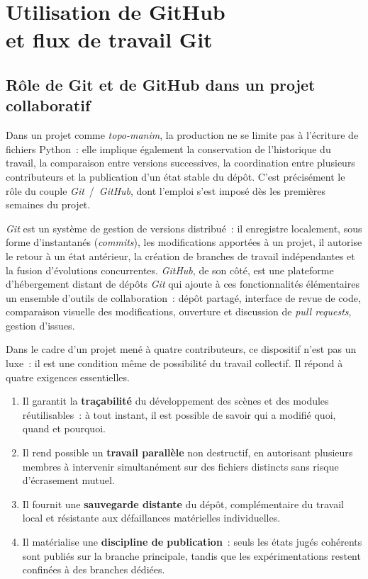 \documentclass[12pt, a4paper, openany]{report}
\begin{document}
	\chapter[GitHub et Git]{Utilisation de GitHub\\et flux de travail Git}\label{chap:github}
	
	\section{Rôle de Git et de GitHub dans un projet collaboratif}

	Dans un projet comme \textit{topo-manim}, la production ne se limite pas à l’écriture de fichiers Python~: elle implique également la conservation de l’historique du travail, la comparaison entre versions successives, la coordination entre plusieurs contributeurs et la publication d’un état stable du dépôt. C’est précisément le rôle du couple \textit{Git}~/~\textit{GitHub}, dont l’emploi s’est imposé dès les premières semaines du projet.

	\textit{Git} est un système de gestion de versions distribué~: il enregistre localement, sous forme d’instantanés (\textit{commits}), les modifications apportées à un projet, il autorise le retour à un état antérieur, la création de branches de travail indépendantes et la fusion d’évolutions concurrentes. \textit{GitHub}, de son côté, est une plateforme d’hébergement distant de dépôts \textit{Git} qui ajoute à ces fonctionnalités élémentaires un ensemble d’outils de collaboration~: dépôt partagé, interface de revue de code, comparaison visuelle des modifications, ouverture et discussion de \textit{pull requests}, gestion d’issues.

	Dans le cadre d’un projet mené à quatre contributeurs, ce dispositif n’est pas un luxe~: il est une condition même de possibilité du travail collectif. Il répond à quatre exigences essentielles.

	\begin{enumerate}
		\item Il garantit la \textbf{traçabilité} du développement des scènes et des modules réutilisables~: à tout instant, il est possible de savoir qui a modifié quoi, quand et pourquoi.
		\item Il rend possible un \textbf{travail parallèle} non destructif, en autorisant plusieurs membres à intervenir simultanément sur des fichiers distincts sans risque d’écrasement mutuel.
		\item Il fournit une \textbf{sauvegarde distante} du dépôt, complémentaire du travail local et résistante aux défaillances matérielles individuelles.
		\item Il matérialise une \textbf{discipline de publication}~: seuls les états jugés cohérents sont publiés sur la branche principale, tandis que les expérimentations restent confinées à des branches dédiées.
	\end{enumerate}
\end{document}
